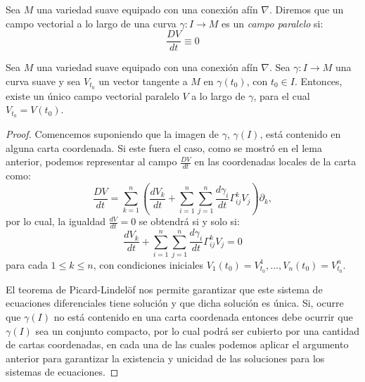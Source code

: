 \begin{definition}
	Sea $M$ una variedad suave equipado con una conexión afín $\nabla$. Diremos que un campo vectorial a lo largo de una curva $\gamma: I \to M$ es un \textit{campo paralelo} si:
	\[
		\frac{DV}{dt} \equiv 0
	\]
\end{definition}

\begin{theorem}\label{Teorema: Existencia y Unicidad de Campos Paralelos}
	Sea $M$ una variedad suave equipado con una conexión afín $\nabla$. Sea $\gamma: I \to M$ una curva suave y sea $V_{t_{0}}$ un vector tangente a $M$ en $\gamma(t_{0})$, con $t_{0} \in I$. Entonces, existe un único campo vectorial paralelo $V$ a lo largo de $\gamma$, para el cual $V_{t_{0}} = V(t_{0})$.
\end{theorem}

\begin{proof}
	Comencemos suponiendo que la imagen de $\gamma$, $\gamma(I)$, está contenido en alguna carta coordenada. Si este fuera el caso, como se mostró en el lema anterior, podemos representar al campo $\frac{DV}{dt}$ en las coordenadas locales de la carta como:
	\[
		\frac{DV}{dt} = \sum_{k=1}^{n} \left(\frac{dV_{k}}{dt}
		+ \sum_{i=1}^{n}\sum_{j=1}^{n} \frac{d\gamma_{i}}{dt} \Gamma_{ij}^{k} V_{j}\right) \partial_{k},
	\]
	por lo cual, la igualdad $\frac{dV}{dt} = 0$ se obtendrá si y solo si:
	\[
		\frac{d V_{k}}{dt} + \sum_{i=1}^{n}\sum_{j=1}^{n} \frac{d\gamma_{i}}{dt} \Gamma_{ij}^{k} V_{j} = 0
	\]
	para cada $1 \leq k \leq n$, con condiciones iniciales $V_{1}(t_{0}) = V^{1}_{t_{0}}, \ldots, V_{n}(t_{0}) = V^{n}_{t_0}$.

	El teorema de Picard-Lindelöf nos permite garantizar que este sistema de ecuaciones diferenciales tiene solución y que dicha solución es única. Si, ocurre que $\gamma(I)$ no está contenido en una carta coordenada entonces debe ocurrir que $\gamma(I)$ sea un conjunto compacto, por lo cual podrá ser cubierto por una cantidad de cartas coordenadas, en cada una de las cuales podemos aplicar el argumento anterior para garantizar la existencia y unicidad de las soluciones para los sistemas de ecuaciones.
\end{proof}
